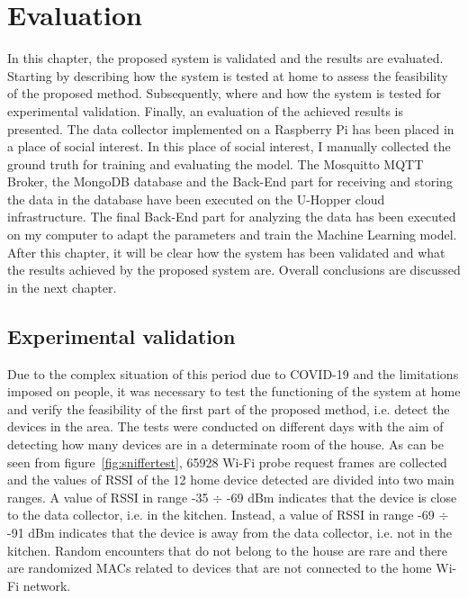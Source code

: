\chapter{Evaluation}
\label{cha:evaluation}
\vspace{0.4 cm} 

In this chapter, the proposed system is validated and the results are evaluated.
Starting by describing how the system is tested at home to assess the feasibility of the proposed method. Subsequently, where and how the system is tested for experimental validation. Finally, an evaluation of the achieved results is presented. The data collector implemented on a Raspberry Pi has been placed in a place of social interest. In this place of social interest, I manually collected the ground truth for training and evaluating the model. The Mosquitto MQTT Broker, the MongoDB database and the Back-End part for receiving and storing the data in the database have been executed on the U-Hopper cloud infrastructure. The final Back-End part for analyzing the data has been executed on my computer to adapt the parameters and train the Machine Learning model. After this chapter, it will be clear how the system has been validated and what the results achieved by the proposed system are. Overall conclusions are discussed in the next chapter.


\section{Experimental validation}
\label{sec:expval}
\vspace{0.2 cm} 

Due to the complex situation of this period due to COVID-19 and the limitations imposed on people, it was necessary to test the functioning of the system at home and verify the feasibility of the first part of the proposed method, i.e. detect the devices in the area. The tests were conducted on different days with the aim of detecting how many devices are in a determinate room of the house. As can be seen from figure~\ref{fig:sniffertest}, 65928 Wi-Fi probe request frames are collected and the values of RSSI of the 12 home device detected are divided into two main ranges. A value of RSSI in range -35 $\div$ -69 dBm indicates that the device is close to the data collector, i.e. in the kitchen. Instead, a value of RSSI in range -69 $\div$ -91 dBm indicates that the device is away from the data collector, i.e. not in the kitchen. Random encounters that do not belong to the house are rare and there are randomized MACs related to devices that are not connected to the home Wi-Fi network.

